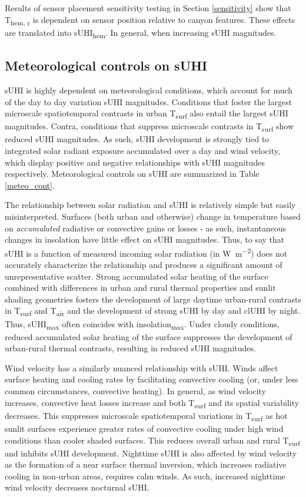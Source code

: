 \begin{bibunit}
Results of sensor placement sensitivity testing in Section \ref{sensitivity} show that T\textsubscript{hem, r} is dependent on sensor position relative to canyon features. These effects are translated into sUHI\textsubscript{hem}. In general, when increasing sUHI magnitudes. 

\subsection{Meteorological controls on sUHI}

sUHI is highly dependent on meteorological conditions, which account for much of the day to day variation sUHI magnitudes. Conditions that foster the largest microscale spatiotemporal contrasts in urban T\textsubscript{surf} also entail the largest sUHI magnitudes. Contra, conditions that suppress microscale contrasts in T\textsubscript{surf} show reduced sUHI magnitudes. As such, sUHI development is strongly tied to integrated solar radiant exposure accumulated over a day and wind velocity, which display positive and negative relationships with sUHI magnitudes respectively. Meteorological controls on sUHI are summarized in Table \ref{meteo_cont}.

The relationship between solar radiation and sUHI is relatively simple but easily misinterpreted. Surfaces (both urban and otherwise) change in temperature based on \textit{accumulated} radiative or convective gains or losses - as such, instantaneous changes in insolation have little effect on sUHI magnitudes. Thus, to say that sUHI is a function of measured incoming solar radiation (in \si{\watt\per\square\meter}) does not accurately characterize the relationship and produces a significant amount of unrepresentative scatter. Strong accumulated solar heating of the surface combined with differences in urban and rural thermal properties and sunlit shading geometries fosters the development of large daytime urban-rural contrasts in T\textsubscript{surf} and T\textsubscript{air} and the development of strong sUHI by day and clUHI by night. Thus, sUHI\textsubscript{max} often coincides with insolation\textsubscript{max}. Under cloudy conditions, reduced accumulated solar heating of the surface suppresses the development of urban-rural thermal contrasts, resulting in reduced sUHI magnitudes. 

Wind velocity has a similarly nuanced relationship with sUHI. Winds affect surface heating and cooling rates by facilitating convective cooling (or, under less common circumstances, convective heating). In general, as wind velocity increases, convective heat losses increase and both T\textsubscript{surf} and its spatial variability decreases. This suppresses microscale spatiotemporal variations in T\textsubscript{surf} as hot sunlit surfaces experience greater rates of convective cooling under high wind conditions than cooler shaded surfaces. This reduces overall urban and rural T\textsubscript{surf} and inhibits sUHI development. Nighttime sUHI is also affected by wind velocity as the formation of a near surface thermal inversion, which increases radiative cooling in non-urban areas, requires calm winds. As such, increased nighttime wind velocity decreases nocturnal sUHI.


\end{bibunit}

